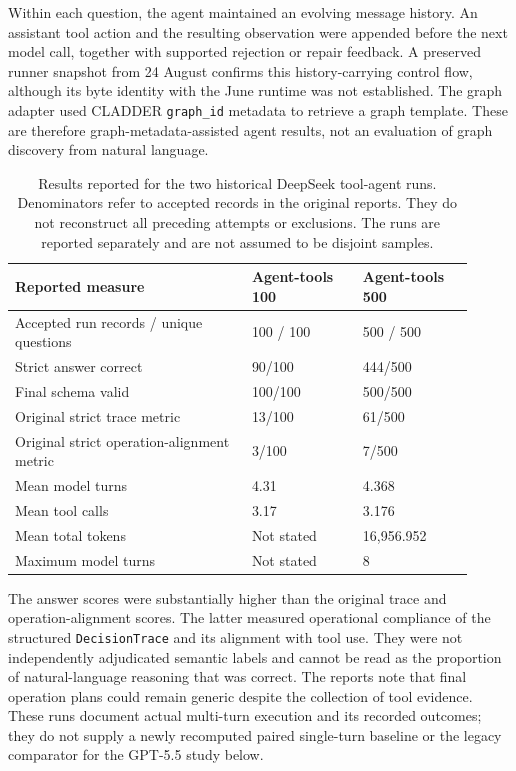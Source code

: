 Within each question, the agent maintained an evolving message history. An assistant tool action and the resulting observation were appended before the next model call, together with supported rejection or repair feedback. A preserved runner snapshot from 24 August confirms this history-carrying control flow, although its byte identity with the June runtime was not established. The graph adapter used CLADDER \texttt{graph\_id} metadata to retrieve a graph template. These are therefore graph-metadata-assisted agent results, not an evaluation of graph discovery from natural language.

\begin{table}[htbp]
\centering
\small
\setlength{\tabcolsep}{4pt}
\renewcommand{\arraystretch}{1.12}
\caption[Historical DeepSeek tool-agent results]{Results reported for the two historical DeepSeek tool-agent runs. Denominators refer to accepted records in the original reports. They do not reconstruct all preceding attempts or exclusions. The runs are reported separately and are not assumed to be disjoint samples.}
\label{tab:system-agent-runs}
\begin{tabular}{p{0.47\linewidth}p{0.22\linewidth}p{0.22\linewidth}}
\hline
Reported measure & Agent-tools 100 & Agent-tools 500 \\
\hline
Accepted run records / unique questions & 100 / 100 & 500 / 500 \\
Strict answer correct & 90/100 & 444/500 \\
Final schema valid & 100/100 & 500/500 \\
Original strict trace metric & 13/100 & 61/500 \\
Original strict operation-alignment metric & 3/100 & 7/500 \\
Mean model turns & 4.31 & 4.368 \\
Mean tool calls & 3.17 & 3.176 \\
Mean total tokens & Not stated & 16,956.952 \\
Maximum model turns & Not stated & 8 \\
\hline
\end{tabular}
\end{table}

The answer scores were substantially higher than the original trace and operation-alignment scores. The latter measured operational compliance of the structured \texttt{DecisionTrace} and its alignment with tool use. They were not independently adjudicated semantic labels and cannot be read as the proportion of natural-language reasoning that was correct. The reports note that final operation plans could remain generic despite the collection of tool evidence. These runs document actual multi-turn execution and its recorded outcomes; they do not supply a newly recomputed paired single-turn baseline or the legacy comparator for the GPT-5.5 study below.

